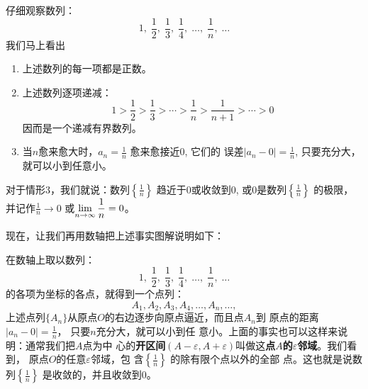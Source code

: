\begin{example}
    仔细观察数列：
    \[1,\; \frac{1}{2},\;\frac{1}{3},\;\frac{1}{4},\; \ldots,\;\frac{1}{n},\;\ldots\]
我们马上看出
\begin{enumerate}
    \item 上述数列的每一项都是正数。
    \item 上述数列逐项递减：
\[1>\frac{1}{2}>\frac{1}{3}>\cdots>\frac{1}{n}>\frac{1}{n+1}>\cdots>0\]
因而是一个递减有界数列。
\item 当$n$愈来愈大时，$a_n=\frac{1}{n}$
愈来愈接近0, 它们的
误差$|a_n-0|=\frac{1}{n}$, 只要充分大，就可以小到任意小。
\end{enumerate}

对于情形3，我们就说：数列$\left\{\frac{1}{n}\right\}$
趋近于0或收敛到0, 或0是数列$\left\{\frac{1}{n}\right\}$
的极限，并记作$\frac{1}{n}\to 0$
或$\displaystyle\lim_{n\to\infty}\dfrac{1}{n}=0$。

现在，让我们再用数轴把上述事实图解说明如下：
\begin{figure}[htp]
    \centering
    \caption{}
\end{figure}

在数轴上取以数列：
\[1,\; \frac{1}{2},\;\frac{1}{3},\;\frac{1}{4},\; \ldots,\;\frac{1}{n},\;\ldots\]
的各项为坐标的各点，就得到一个点列：
\[A_1,A_2,A_3,A_4,\ldots,A_n,\ldots,\]
上述点列$\{A_n\}$从原点$O$的右边逐步向原点逼近，而且点$A_n$到
原点的距离$|a_n-0|=\frac{1}{n}$，
只要$n$充分大，就可以小到任
意小。上面的事实也可以这样来说明：通常我们把$A$点为中
心的\textbf{开区间}$(A-\varepsilon,A+\varepsilon)$叫做这\textbf{点$A$的$\varepsilon$邻域}。我们看到，
原点$O$的任意$\varepsilon$邻域，包
含$\left\{\frac{1}{n}\right\}$
的除有限个点以外的全部
点。这也就是说数列$\left\{\frac{1}{n}\right\}$
是收敛的，并且收敛到0。
\end{example}

